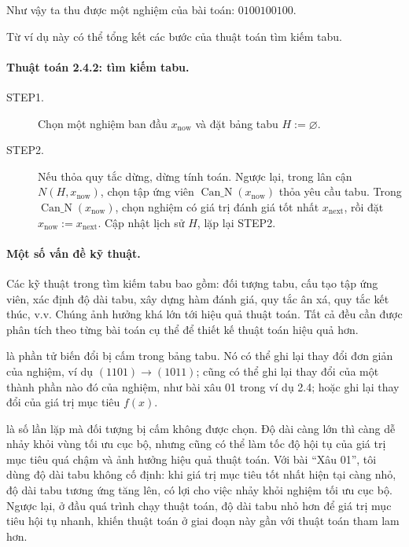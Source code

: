 \documentclass[11pt]{article}
\begin{document}
Như vậy ta thu được một nghiệm của bài toán: \(0100100100\).

Từ ví dụ này có thể tổng kết các bước của thuật toán tìm kiếm tabu.

\paragraph{Thuật toán 2.4.2: tìm kiếm tabu.}
\begin{description}
  \item[STEP1.] Chọn một nghiệm ban đầu \(x_{\mathrm{now}}\) và đặt bảng tabu
  \(H:=\varnothing\).
  \item[STEP2.] Nếu thỏa quy tắc dừng, dừng tính toán. Ngược lại, trong lân
  cận \(N(H,x_{\mathrm{now}})\), chọn tập ứng viên
  \(\operatorname{Can\_N}(x_{\mathrm{now}})\) thỏa yêu cầu tabu. Trong
  \(\operatorname{Can\_N}(x_{\mathrm{now}})\), chọn nghiệm có giá trị đánh giá
  tốt nhất \(x_{\mathrm{next}}\), rồi đặt
  \(x_{\mathrm{now}}:=x_{\mathrm{next}}\). Cập nhật lịch sử \(H\), lặp lại
  STEP2.
\end{description}

\paragraph{Một số vấn đề kỹ thuật.}
Các kỹ thuật trong tìm kiếm tabu bao gồm: đối tượng tabu, cấu tạo tập ứng
viên, xác định độ dài tabu, xây dựng hàm đánh giá, quy tắc ân xá, quy tắc kết
thúc, v.v. Chúng ảnh hưởng khá lớn tới hiệu quả thuật toán. Tất cả đều cần
được phân tích theo từng bài toán cụ thể để thiết kế thuật toán hiệu quả hơn.

 là phần tử biến đổi bị cấm trong bảng tabu. Nó có thể
ghi lại thay đổi đơn giản của nghiệm, ví dụ \((1101)\to(1011)\); cũng có thể
ghi lại thay đổi của một thành phần nào đó của nghiệm, như bài xâu 01 trong
ví dụ 2.4; hoặc ghi lại thay đổi của giá trị mục tiêu \(f(x)\).

 là số lần lặp mà đối tượng bị cấm không được chọn. Độ dài
càng lớn thì càng dễ nhảy khỏi vùng tối ưu cục bộ, nhưng cũng có thể làm tốc
độ hội tụ của giá trị mục tiêu quá chậm và ảnh hưởng hiệu quả thuật toán. Với
bài ``Xâu 01'', tôi dùng độ dài tabu không cố định: khi giá trị mục tiêu tốt
nhất hiện tại càng nhỏ, độ dài tabu tương ứng tăng lên, có lợi cho việc nhảy
khỏi nghiệm tối ưu cục bộ. Ngược lại, ở đầu quá trình chạy thuật toán, độ dài
tabu nhỏ hơn để giá trị mục tiêu hội tụ nhanh, khiến thuật toán ở giai đoạn
này gần với thuật toán tham lam hơn.
\end{document}
